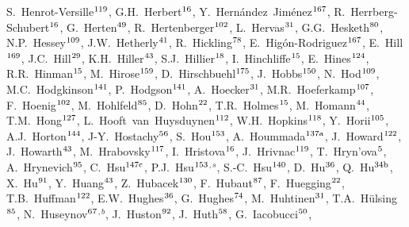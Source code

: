 \begin{flushleft}
S.~Henrot-Versille$^\textrm{\scriptsize 119}$,
G.H.~Herbert$^\textrm{\scriptsize 16}$,
Y.~Hern\'andez~Jim\'enez$^\textrm{\scriptsize 167}$,
R.~Herrberg-Schubert$^\textrm{\scriptsize 16}$,
G.~Herten$^\textrm{\scriptsize 49}$,
R.~Hertenberger$^\textrm{\scriptsize 102}$,
L.~Hervas$^\textrm{\scriptsize 31}$,
G.G.~Hesketh$^\textrm{\scriptsize 80}$,
N.P.~Hessey$^\textrm{\scriptsize 109}$,
J.W.~Hetherly$^\textrm{\scriptsize 41}$,
R.~Hickling$^\textrm{\scriptsize 78}$,
E.~Hig\'on-Rodriguez$^\textrm{\scriptsize 167}$,
E.~Hill$^\textrm{\scriptsize 169}$,
J.C.~Hill$^\textrm{\scriptsize 29}$,
K.H.~Hiller$^\textrm{\scriptsize 43}$,
S.J.~Hillier$^\textrm{\scriptsize 18}$,
I.~Hinchliffe$^\textrm{\scriptsize 15}$,
E.~Hines$^\textrm{\scriptsize 124}$,
R.R.~Hinman$^\textrm{\scriptsize 15}$,
M.~Hirose$^\textrm{\scriptsize 159}$,
D.~Hirschbuehl$^\textrm{\scriptsize 175}$,
J.~Hobbs$^\textrm{\scriptsize 150}$,
N.~Hod$^\textrm{\scriptsize 109}$,
M.C.~Hodgkinson$^\textrm{\scriptsize 141}$,
P.~Hodgson$^\textrm{\scriptsize 141}$,
A.~Hoecker$^\textrm{\scriptsize 31}$,
M.R.~Hoeferkamp$^\textrm{\scriptsize 107}$,
F.~Hoenig$^\textrm{\scriptsize 102}$,
M.~Hohlfeld$^\textrm{\scriptsize 85}$,
D.~Hohn$^\textrm{\scriptsize 22}$,
T.R.~Holmes$^\textrm{\scriptsize 15}$,
M.~Homann$^\textrm{\scriptsize 44}$,
T.M.~Hong$^\textrm{\scriptsize 127}$,
L.~Hooft~van~Huysduynen$^\textrm{\scriptsize 112}$,
W.H.~Hopkins$^\textrm{\scriptsize 118}$,
Y.~Horii$^\textrm{\scriptsize 105}$,
A.J.~Horton$^\textrm{\scriptsize 144}$,
J-Y.~Hostachy$^\textrm{\scriptsize 56}$,
S.~Hou$^\textrm{\scriptsize 153}$,
A.~Hoummada$^\textrm{\scriptsize 137a}$,
J.~Howard$^\textrm{\scriptsize 122}$,
J.~Howarth$^\textrm{\scriptsize 43}$,
M.~Hrabovsky$^\textrm{\scriptsize 117}$,
I.~Hristova$^\textrm{\scriptsize 16}$,
J.~Hrivnac$^\textrm{\scriptsize 119}$,
T.~Hryn'ova$^\textrm{\scriptsize 5}$,
A.~Hrynevich$^\textrm{\scriptsize 95}$,
C.~Hsu$^\textrm{\scriptsize 147c}$,
P.J.~Hsu$^\textrm{\scriptsize 153}$$^{,s}$,
S.-C.~Hsu$^\textrm{\scriptsize 140}$,
D.~Hu$^\textrm{\scriptsize 36}$,
Q.~Hu$^\textrm{\scriptsize 34b}$,
X.~Hu$^\textrm{\scriptsize 91}$,
Y.~Huang$^\textrm{\scriptsize 43}$,
Z.~Hubacek$^\textrm{\scriptsize 130}$,
F.~Hubaut$^\textrm{\scriptsize 87}$,
F.~Huegging$^\textrm{\scriptsize 22}$,
T.B.~Huffman$^\textrm{\scriptsize 122}$,
E.W.~Hughes$^\textrm{\scriptsize 36}$,
G.~Hughes$^\textrm{\scriptsize 74}$,
M.~Huhtinen$^\textrm{\scriptsize 31}$,
T.A.~H\"ulsing$^\textrm{\scriptsize 85}$,
N.~Huseynov$^\textrm{\scriptsize 67}$$^{,b}$,
J.~Huston$^\textrm{\scriptsize 92}$,
J.~Huth$^\textrm{\scriptsize 58}$,
G.~Iacobucci$^\textrm{\scriptsize 50}$,

\end{flushleft}
